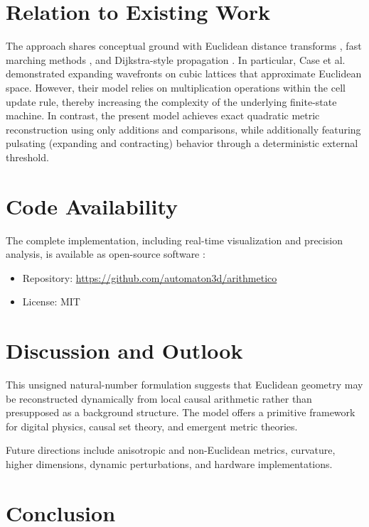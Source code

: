 \documentclass[11pt,a4paper]{article}
\begin{document}
\section{Relation to Existing Work}

The approach shares conceptual ground with Euclidean distance transforms \cite{danielsson1980}, fast marching methods \cite{sethian1996}, and Dijkstra-style propagation \cite{dijkstra1959}. In particular, Case et al. \cite{case2001lattice} demonstrated expanding wavefronts on cubic lattices that approximate Euclidean space. However, their model relies on multiplication operations within the cell update rule, thereby increasing the complexity of the underlying finite-state machine. In contrast, the present model achieves exact quadratic metric reconstruction using only additions and comparisons, while additionally featuring pulsating (expanding and contracting) behavior through a deterministic external threshold.

\section{Code Availability}

The complete implementation, including real-time visualization and precision analysis, is available as open-source software \cite{neto2026arithmetico}:

\begin{itemize}
    \item Repository: \url{https://github.com/automaton3d/arithmetico}
    \item License: MIT
\end{itemize}

\section{Discussion and Outlook}

This unsigned natural-number formulation suggests that Euclidean geometry may be reconstructed dynamically from local causal arithmetic rather than presupposed as a background structure. The model offers a primitive framework for digital physics, causal set theory, and emergent metric theories.

Future directions include anisotropic and non-Euclidean metrics, curvature, higher dimensions, dynamic perturbations, and hardware implementations.

\section{Conclusion}
\end{document}
